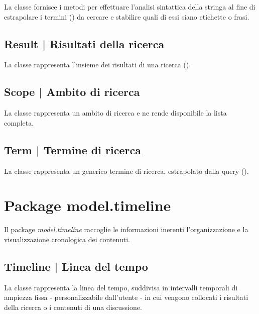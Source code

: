 \documentclass[10pt,a4paper,headinclude,footinclude,hidelinks]{scrreprt} %
\begin{document}
	La classe fornisce i metodi per effettuare l'analisi sintattica della stringa al fine di estrapolare i termini (\textit{}) da cercare e stabilire quali di essi siano etichette o frasi.

	\subsection[Result]{Result | Risultati della ricerca}
	\label{sec:stage:design:model.search:search-result}
	La classe \textit{} rappresenta l'insieme dei risultati di una ricerca (\textit{}).

	\subsection[Scope]{Scope | Ambito di ricerca}
	\label{sec:stage:design:model.search:search-scope}
	La classe \textit{} rappresenta un ambito di ricerca e ne rende disponibile la lista completa.

	\subsection[Term]{Term | Termine di ricerca}
	\label{sec:stage:design:model.search:search-term}
	La classe \textit{} rappresenta un generico termine di ricerca, estrapolato dalla query (\textit{}).

	\section{Package model.timeline}
	\label{sec:stage:design:model.timeline}
	Il package \textit{model.timeline} raccoglie le informazioni inerenti l'organizzazione e la visualizzazione cronologica dei contenuti.

	\subsection[Timeline]{Timeline | Linea del tempo}
	\label{sec:stage:design:model.timeline:timeline}
	La classe \textit{} rappresenta la linea del tempo, suddivisa in intervalli temporali \textit{} di ampiezza fissa - personalizzabile dall'utente - in cui vengono collocati i risultati della ricerca o i contenuti di una discussione.
\end{document}
